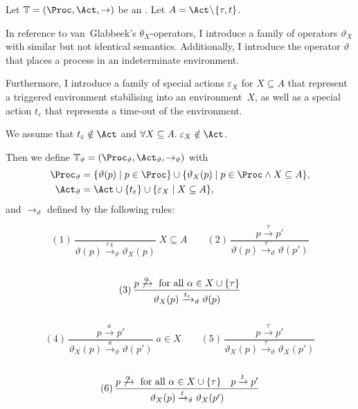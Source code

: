 %
\begin{isabellebody}%
%
%
\isadelimtheory
%
\endisadelimtheory
%
\isatagtheory
%
\endisatagtheory
{\isafoldtheory}%
%
\isadelimtheory
%
\endisadelimtheory
%
\isadelimdocument
%
\endisadelimdocument
%
\isatagdocument
%
\isamarkuptrue%
%
\endisatagdocument
{\isafolddocument}%
%
\isadelimdocument
%
\endisadelimdocument
%
\begin{isamarkuptext}%
\label{sec:mapping_processes}%
\end{isamarkuptext}\isamarkuptrue%
%
\begin{isamarkuptext}%
Let $\mathbb{T} = (\Proc, \Act, \rightarrow)$ be an \LTSt{}. Let $A = \Act \!\setminus\! \{\tau, t\}$.

In reference to van~Glabbeek's $\theta_X$-operators, I introduce a family of operators $\vartheta_X$ with similar but not identical semantics. Additionally, I introduce the operator $\vartheta$ that places a process in an indeterminate environment.

Furthermore, I introduce a family of special actions $\varepsilon_X$ for $X \subseteq A$ that represent a triggered environment stabilising into an environment~$X$, as well as a special action $t_\varepsilon$ that represents a time-out of the environment.

We assume that $t_\varepsilon \notin \Act$ and $\forall X \subseteq A.\; \varepsilon_X \notin \Act$. 

Then we define $\mathbb{T}_\vartheta = (\Proc_\vartheta, \Act_\vartheta, \rightarrow_\vartheta)$ with
\begin{align*}
    \Proc_\vartheta &= \{ \vartheta(p) \mid p \in \Proc \} \cup \{ \vartheta_X(p) \mid p \in \Proc \wedge X \subseteq A \}, \\
    \Act_\vartheta &= \Act \cup \{t_\varepsilon\} \cup \{ \varepsilon_X \mid X \subseteq A \},
\end{align*}
and $\rightarrow_\vartheta$ defined by the following rules:

$$
(1)\,\frac{}{\vartheta(p) \xrightarrow{\varepsilon_X}_\vartheta \vartheta_X(p)} \; X \subseteq A
\qquad
(2)\,\frac{p \xrightarrow{\tau} p'}{\vartheta(p) \xrightarrow{\tau}_\vartheta \vartheta(p')}
$$
\\[-5pt]
$$
(3)\,\frac{p \not\xrightarrow{\alpha} \text{ for all } \alpha \in X \cup \{\tau\}}
{\vartheta_X(p) \xrightarrow{t_\varepsilon}_\vartheta \vartheta(p)}
$$
\\[-5pt]
$$
(4)\,\frac{p \xrightarrow{a} p'}{\vartheta_X(p) \xrightarrow{a}_\vartheta \vartheta(p')} \; a \in X
\qquad
(5)\,\frac{p \xrightarrow{\tau} p'}{\vartheta_X(p) \xrightarrow{\tau}_\vartheta \vartheta_X(p')}
$$
\\[-5pt]
$$
(6)\,\frac{p \not\xrightarrow{\alpha} \text{ for all } \alpha \in X \cup \{\tau\} \quad p \xrightarrow{t} p'}
{\vartheta_X(p) \xrightarrow{t}_\vartheta \vartheta_X(p')}
$$\\


\end{isamarkuptext}
\end{isabellebody}
